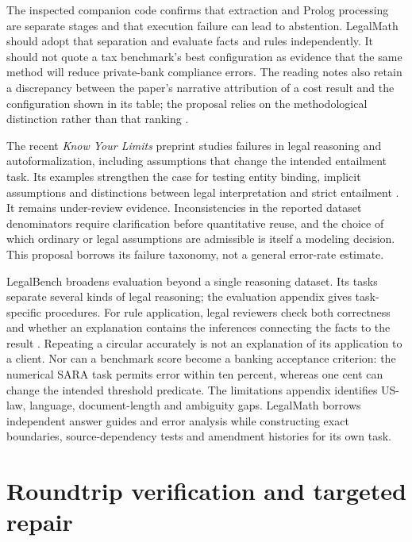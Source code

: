 The inspected companion code confirms that extraction and Prolog processing are
separate stages and that execution failure can lead to abstention. LegalMath
should adopt that separation and evaluate facts and rules independently. It
should not quote a tax benchmark's best configuration as evidence that the same
method will reduce private-bank compliance errors. The reading notes also retain
a discrepancy between the paper's narrative attribution of a cost result and
the configuration shown in its table; the proposal relies on the methodological
distinction rather than that ranking \citep{libraryreview}.

The recent \emph{Know Your Limits} preprint studies failures in legal reasoning
and autoformalization, including assumptions that change the intended entailment
task. Its examples strengthen the case for testing entity binding, implicit
assumptions and distinctions between legal interpretation and strict entailment
\citep[secs.~3--5]{limits2026}. It remains under-review evidence. Inconsistencies
in the reported dataset denominators require clarification before quantitative
reuse, and the choice of which ordinary or legal assumptions are admissible is
itself a modeling decision. This proposal borrows its failure taxonomy, not a
general error-rate estimate.

LegalBench broadens evaluation beyond a single reasoning dataset. Its tasks
separate several kinds of legal reasoning; the evaluation appendix gives
task-specific procedures. For rule application, legal reviewers check both
correctness and whether an explanation contains the inferences connecting the
facts to the result \citep[sec.~3 and evaluation appendix]{legalbench2023}.
Repeating a circular accurately is not an explanation of its application to a
client. Nor can a benchmark score become a banking acceptance criterion: the
numerical SARA task permits error within ten percent, whereas one cent can change
the intended threshold predicate. The limitations appendix identifies US-law,
language, document-length and ambiguity gaps. LegalMath borrows independent
answer guides and error analysis while constructing exact boundaries,
source-dependency tests and amendment histories for its own task.

\section{Roundtrip verification and targeted repair}
\label{merge:M04:11}

